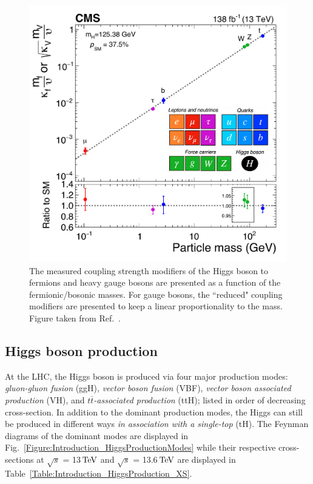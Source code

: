 \begin{figure}[h]
\centering
\includegraphics[width= .7\textwidth]{Figures/Introduction/CMS_Higgs_FermionCouplings.pdf}
\caption[Measured Higgs coupling modifiers versus fermion and boson masses]{The measured coupling strength modifiers of the Higgs boson to fermions and heavy gauge bosons are presented as a function of the fermionic/bosonic masses. For gauge bosons, the ``reduced" coupling modifiers are presented to keep a linear proportionality to the mass. Figure taken from Ref.~\cite{CMS_Couplings_Measurement}.}
\label{Figure:Introduction_CMScouplings}
\end{figure}

\subsection{Higgs boson production}

At the \ac{LHC}, the Higgs boson is produced via four major production modes: \textit{gluon-gluon fusion} (ggH), \textit{vector boson fusion} (VBF), \textit{vector boson associated production} (VH), and \textit{$t\overline{t}$-associated production} (ttH); listed in order of decreasing cross-section. In addition to the dominant production modes, the Higgs can still be produced in different ways \eg \textit{in association with a single-top} (tH). The Feynman diagrams of the dominant modes are displayed in Fig.~\ref{Figure:Introduction_HiggsProductionModes} while their respective cross-sections at $\sqrt{s}$ = 13$\,\text{Te\hspace{-.08em}V}$ and $\sqrt{s}$ = 13.6$\,\text{Te\hspace{-.08em}V}$ are displayed in Table~\ref{Table:Introduction_HiggsProduction_XS}. 


